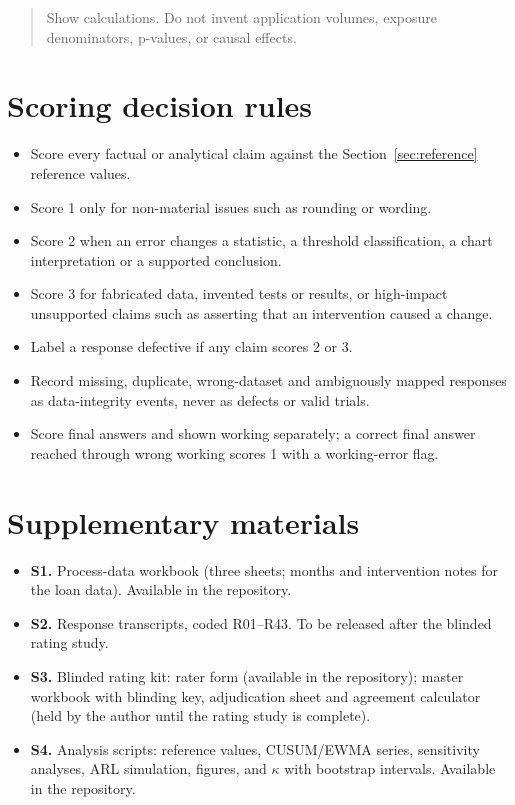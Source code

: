 \documentclass[11pt]{article}
\begin{document}
\begin{quote}
Show calculations. Do not invent application volumes, exposure denominators, p-values, or causal effects.
\end{quote}

\section{Scoring decision rules}
\begin{itemize}[leftmargin=*]
\item Score every factual or analytical claim against the Section~\ref{sec:reference} reference values.
\item Score 1 only for non-material issues such as rounding or wording.
\item Score 2 when an error changes a statistic, a threshold classification, a chart interpretation or a supported conclusion.
\item Score 3 for fabricated data, invented tests or results, or high-impact unsupported claims such as asserting that an intervention caused a change.
\item Label a response defective if any claim scores 2 or 3.
\item Record missing, duplicate, wrong-dataset and ambiguously mapped responses as data-integrity events, never as defects or valid trials.
\item Score final answers and shown working separately; a correct final answer reached through wrong working scores 1 with a working-error flag.
\end{itemize}

\section{Supplementary materials}
\begin{itemize}[leftmargin=*]
\item \textbf{S1.} Process-data workbook (three sheets; months and intervention notes for the loan data). Available in the repository.
\item \textbf{S2.} Response transcripts, coded R01--R43. To be released after the blinded rating study.
\item \textbf{S3.} Blinded rating kit: rater form (available in the repository); master workbook with blinding key, adjudication sheet and agreement calculator (held by the author until the rating study is complete).
\item \textbf{S4.} Analysis scripts: reference values, CUSUM/EWMA series, sensitivity analyses, ARL simulation, figures, and $\kappa$ with bootstrap intervals. Available in the repository.
\end{itemize}
\end{document}
